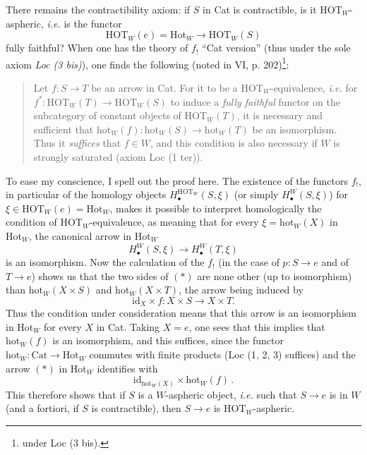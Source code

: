 There remains the contractibility axiom: if $S$ in Cat is contractible, is it $\mathrm{HOT}_W$-aspheric, \textit{i.e.} is the functor
\[
\mathrm{HOT}_W(e) = \mathrm{Hot}_W \longrightarrow \mathrm{HOT}_W(S)
\]
fully faithful? When one has the theory of $f_!$ ``Cat version'' (thus under the sole axiom \textit{Loc (3 bis)}), one finds the following (noted in VI, p. 202)\footnote[52]{under Loc (3 bis).}:
\begin{quote}
Let $f : S \longrightarrow T$ be an arrow in Cat. For it to be a $\mathrm{HOT}_W$-equivalence, \textit{i.e.} for $f^* : \mathrm{HOT}_W(T) \longrightarrow \mathrm{HOT}_W(S)$ to induce a \textit{fully faithful} functor on the subcategory of constant objects of $\mathrm{HOT}_W(T)$, it is necessary and sufficient that $\mathrm{hot}_W(f) : \mathrm{hot}_W(S) \longrightarrow \mathrm{hot}_W(T)$ be an isomorphism. Thus it \textit{suffices} that $f \in W$, and this condition is also necessary if $W$ is strongly saturated (axiom Loc (1 ter)).
\end{quote}
To ease my conscience, I spell out the proof here. The existence of the functors
$f_!$, in particular of the homology objects $H_\bullet^{\mathrm{HOT}_W}(S,\xi)$ (or simply $H_\bullet^W(S,\xi)$) for $\xi \in \mathrm{HOT}_W(e) = \mathrm{Hot}_W$, makes it possible to interpret homologically the condition of $\mathrm{HOT}_W$-equivalence, as meaning that for every $\xi = \mathrm{hot}_W(X)$ in $\mathrm{Hot}_W$, the canonical arrow in $\mathrm{Hot}_W$ %
\[
H_\bullet^W(S,\xi) \longrightarrow H_\bullet^W(T,\xi) \tag*{$(*)$}
\]
is an isomorphism. Now the calculation of the $f_!$ (in the case of $p : S \longrightarrow e$ and of $T \longrightarrow e$) shows us that the two sides of $(*)$ are none other (up to isomorphism) than $\mathrm{hot}_W(X \times S)$ and $\mathrm{hot}_W(X \times T)$, the arrow being induced by
\[
\mathrm{id}_X \times f : X \times S \longrightarrow X \times T. \tag*{$(*)$}
\]
Thus the condition under consideration means that this arrow is an isomorphism in $\mathrm{Hot}_W$ for every $X$ in Cat. Taking $X = e$, one sees that this implies that $\mathrm{hot}_W(f)$ is an isomorphism, and this suffices, since the
functor $\mathrm{hot}_W : \mathrm{Cat} \longrightarrow \mathrm{Hot}_W$ commutes with finite products (Loc (1, 2, 3) suffices) and the arrow $(*)$ in $\mathrm{Hot}_W$ identifies with
\[
\mathrm{id}_{\mathrm{hot}_W(X)} \times \mathrm{hot}_W(f)\,.
\]
This therefore shows that if $S$ is a $W$-aspheric object, \textit{i.e.} such that $S \longrightarrow e$ is in $W$ (and a fortiori, if $S$ is contractible), then $S \longrightarrow e$ is $\mathrm{HOT}_W$-aspheric.


